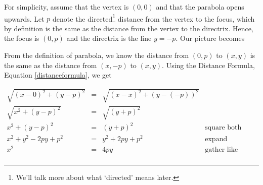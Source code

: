 \documentclass{ximera}
\begin{document}
 

For simplicity, assume that the vertex is $(0,0)$ and that the parabola opens upwards.  Let $p$ denote the directed\footnote{We'll talk more about what `directed' means later.} distance from the vertex to the focus, which by definition is the same as the distance from the vertex to the directrix.   Hence, the focus is $(0,p)$ and the directrix is the line $y = -p$.  Our picture becomes 

\begin{image}

\end{image}

From the definition of parabola, we know the distance from $(0,p)$ to $(x,y)$ is the same as the distance from $(x,-p)$ to $(x,y)$.  Using the Distance Formula, Equation \ref{distanceformula}, we get

\[ \begin{array}{rclr} \sqrt{(x -0)^2 + (y-p)^2} & = & \sqrt{(x-x)^2 + (y - (-p))^2} & \\
\sqrt{x^2 + (y-p)^2} & = & \sqrt{(y+p)^2} & \\
x^2 + (y-p)^2 & = & (y+p)^2 & \mbox{square both sides} \\
x^2 + y^2 - 2py + p^2 & = & y^2 + 2py + p^2 & \mbox{expand quantities} \\
x^2 & = & 4py & \mbox{gather like terms} \\ \end{array} \]
\end{document}
